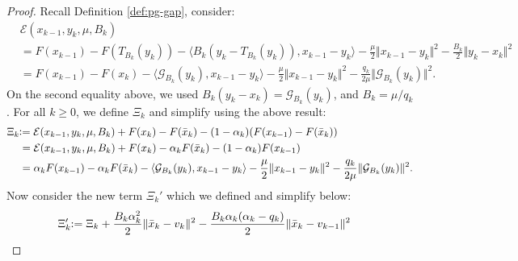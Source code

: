 \documentclass[12pt]{article}
\begin{document}
        \begin{proof}
            Recall Definition \ref{def:pg-gap}, consider: 
            \begin{align*}
                &\mathcal E(x_{k - 1}, y_k, \mu, B_k) 
                \\
                &=
                F(x_{k - 1}) - F(T_{B_k}(y_k))
                - \langle 
                    B_k(y_k - T_{B_k}(y_k)), 
                    x_{k - 1} - y_k
                \rangle
                - \frac{\mu}{2}\Vert x_{k - 1} - y_k\Vert^2
                - \frac{B_k}{2}\Vert y_k - x_k\Vert^2
                \\
                &= 
                F(x_{k - 1}) - F(x_k)
                - \langle 
                    \mathcal G_{B_k}(y_k), 
                    x_{k - 1} - y_k
                \rangle
                - \frac{\mu}{2}\Vert x_{k - 1} - y_k\Vert^2
                - \frac{q_k}{2\mu}\Vert \mathcal G_{B_k}(y_k)\Vert^2. 
            \end{align*}
            On the second equality above, we used $B_k(y_k - x_k)= \mathcal G_{B_k}(y_k)$, and $B_k = \mu/q_k$.
            For all $k \ge 0$, we define $\Xi_k$ and simplify using the above result: 
            \begin{align*}
                \Xi_k &\hspace{-0.3em}\vcentcolon= 
                \mathcal E(x_{k - 1}, y_k, \mu, B_k)
                + F(x_k) - F(\bar x_k)
                - (1 - \alpha_k)(F(x_{k - 1}) - F(\bar x_k))
                \\
                &= 
                \mathcal E(x_{k - 1}, y_k, \mu, B_k)
                + F(x_k) - \alpha_kF(\bar x_k) - (1 - \alpha_k)F(x_{k - 1})
                \\
                &=
                \alpha_kF(x_{k - 1}) - \alpha_k F(\bar x_k)
                - \langle \mathcal G_{B_k}(y_k), x_{k - 1} - y_k\rangle
                - \frac{\mu}{2}\Vert x_{k - 1} - y_k\Vert^2 
                - \frac{q_k}{2\mu}\Vert \mathcal G_{B_k}(y_k)\Vert^2. 
            \end{align*}
            Now consider the new term $\Xi_k'$ which we defined and simplify below: 
            {\allowdisplaybreaks
            \begin{align*}
                \Xi_k'
                &\hspace{-0.3em}:=
                \Xi_k + \frac{B_k\alpha_k^2}{2}\Vert \bar x_k - v_k\Vert^2 
                - \frac{B_k\alpha_k(\alpha_k - q_k)}{2}\Vert \bar x_k - v_{k - 1}\Vert^2

\end{align*}}
\end{proof}
\end{document}
